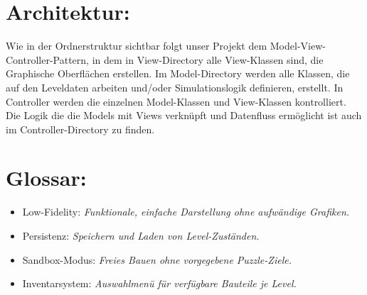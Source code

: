 \documentclass[]{exercise}
\begin{document}
    \section{Architektur:}
        Wie in der Ordnerstruktur sichtbar folgt unser Projekt dem Model-View-Controller-Pattern, in dem in View-Directory alle View-Klassen sind, die Graphische Oberflächen erstellen. Im Model-Directory werden alle Klassen, die auf den Leveldaten arbeiten und/oder Simulationslogik definieren, erstellt. In Controller werden die einzelnen Model-Klassen und View-Klassen kontrolliert. Die Logik die die Models mit Views verknüpft und Datenfluss ermöglicht ist auch im Controller-Directory zu finden. 

    \section{Glossar:}
    \begin{itemize}
        \item Low-Fidelity: \textit{Funktionale, einfache Darstellung ohne aufwändige Grafiken.}
        \item Persistenz: \textit{Speichern und Laden von Level-Zuständen.}
        \item Sandbox-Modus: \textit{Freies Bauen ohne vorgegebene Puzzle-Ziele.}
        \item Inventarsystem: \textit{Auswahlmenü für verfügbare Bauteile je Level.}
    \end{itemize}
\end{document}

